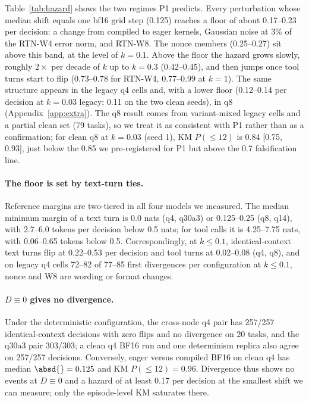 Table~\ref{tab:hazard} shows the two regimes P1 predicts. Every perturbation whose median shift equals one bf16 grid step (0.125) reaches a floor of about 0.17--0.23 per decision: a change from compiled to eager kernels, Gaussian noise at 3\% of the RTN-W4 error norm, and RTN-W8. The nonce members (0.25--0.27) sit above this band, at the level of $k = 0.1$. Above the floor the hazard grows slowly, roughly $2\times$ per decade of $k$ up to $k = 0.3$ (0.42--0.45), and then jumps once tool turns start to flip (0.73--0.78 for RTN-W4, 0.77--0.99 at $k = 1$). The same structure appears in the legacy q4 cells and, with a lower floor (0.12--0.14 per decision at $k{=}0.03$ legacy; 0.11 on the two clean seeds), in q8 (Appendix~\ref{app:extra}). The q8 result comes from variant-mixed legacy cells and a partial clean set (79 tasks), so we treat it as consistent with P1 rather than as a confirmation; for clean q8 at $k{=}0.03$ (seed 1), KM $P(\le 12)$ is 0.84 [0.75, 0.93], just below the 0.85 we pre-registered for P1 but above the 0.7 falsification line.

\paragraph{The floor is set by text-turn ties.} Reference margins are two-tiered in all four models we measured. The median minimum margin of a text turn is 0.0 nats (q4, q30a3) or 0.125--0.25 (q8, q14), with 2.7--6.0 tokens per decision below 0.5 nats; for tool calls it is 4.25--7.75 nats, with 0.06--0.65 tokens below 0.5. Correspondingly, at $k \le 0.1$, identical-context text turns flip at 0.22--0.53 per decision and tool turns at 0.02--0.08 (q4, q8), and on legacy q4 cells 72--82 of 77--85 first divergences per configuration at $k \le 0.1$, nonce and W8 are wording or format changes.

\paragraph{$D \equiv 0$ gives no divergence.} Under the deterministic configuration, the cross-node q4 pair has 257/257 identical-context decisions with zero flips and no divergence on 20 tasks, and the q30a3 pair 303/303; a clean q4 BF16 run and one determinism replica also agree on 257/257 decisions. Conversely, eager versus compiled BF16 on clean q4 has median $\absd{} = 0.125$ and KM $P(\le 12) = 0.96$. Divergence thus shows no events at $D \equiv 0$ and a hazard of at least 0.17 per decision at the smallest shift we can measure; only the episode-level KM saturates there.

